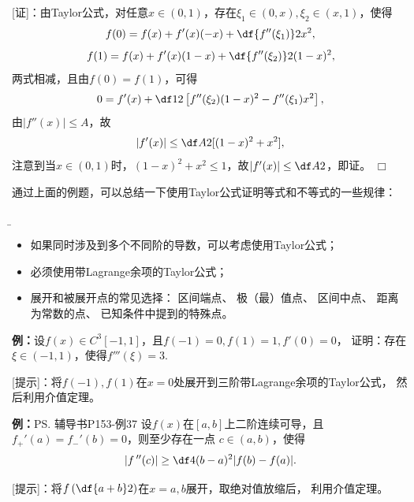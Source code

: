 [证]：由Taylor公式，对任意$x\in(0,1)$，存在$\xi_1\in(0,x),
\xi_2\in(x,1)$，使得
$$f(0)=f(x)+f'(x)(-x)+\df{f''(\xi_1)}2x^2,$$
$$f(1)=f(x)+f'(x)(1-x)+\df{f''(\xi_2)}2(1-x)^2,$$
两式相减，且由$f(0)=f(1)$，可得
$$0=f'(x)+\df12\left[f''(\xi_2)(1-x)^2-f''(\xi_1)x^2\right],$$
由$|f''(x)|\leq A$，故
$$|f'(x)|\leq\df A2[(1-x)^2+x^2],$$
注意到当$x\in(0,1)$时，$(1-x)^2+x^2\leq1$，故$|f'(x)|\leq\df A2$，即证。
\hfill$\Box$

通过上面的例题，可以总结一下使用Taylor公式证明等式和不等式的一些规律：
{\b
\begin{itemize}
  \item 如果同时涉及到多个不同阶的导数，可以考虑使用Taylor公式；
  \item 必须使用带Lagrange余项的Taylor公式；
  \item 展开和被展开点的常见选择： 区间端点、 极（最）值点、
  区间中点、 距离为常数的点、 已知条件中提到的特殊点。
\end{itemize}
}

{\bf 例：}设$f(x)\in C^3[-1,1]$，且$f(-1)=0,f(1)=1,f'(0)=0$，
证明：存在$\xi\in(-1,1)$，使得$f'''(\xi)=3$.

[提示]：将$f(-1),f(1)$在$x=0$处展开到三阶带Lagrange余项的Taylor公式，
然后利用介值定理。

{\bf 例：}\ps{辅导书P153-例37}
设$f(x)$在$[a,b]$上二阶连续可导，且$f_+'(a)=f_-'(b)=0$，则至少存在一点
$c\in(a,b)$，使得
$$|f\,''(c)|\geq \df 4{(b-a)^2}|f(b)-f(a)|.$$

[提示]：将$f\left(\df{a+b}2\right)$在$x=a,b$展开，取绝对值放缩后，
利用介值定理。

